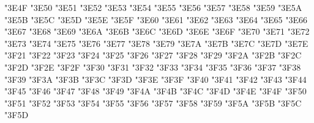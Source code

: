 {\Uchar\jis"3E4F %
\Uchar\jis"3E50 %
\Uchar\jis"3E51 %
\Uchar\jis"3E52 %
\Uchar\jis"3E53 %
\Uchar\jis"3E54 %
\Uchar\jis"3E55 %
\Uchar\jis"3E56 %
\Uchar\jis"3E57 %
\Uchar\jis"3E58 %
\Uchar\jis"3E59 %
\Uchar\jis"3E5A %
\Uchar\jis"3E5B %
\Uchar\jis"3E5C %
\Uchar\jis"3E5D %
\Uchar\jis"3E5E %
\Uchar\jis"3E5F %
\Uchar\jis"3E60 %
\Uchar\jis"3E61 %
\Uchar\jis"3E62 %
\Uchar\jis"3E63 %
\Uchar\jis"3E64 %
\Uchar\jis"3E65 %
\Uchar\jis"3E66 %
\Uchar\jis"3E67 %
\Uchar\jis"3E68 %
\Uchar\jis"3E69 %
\Uchar\jis"3E6A %
\Uchar\jis"3E6B %
\Uchar\jis"3E6C %
\Uchar\jis"3E6D %
\Uchar\jis"3E6E %
\Uchar\jis"3E6F %
\Uchar\jis"3E70 %
\Uchar\jis"3E71 %
\Uchar\jis"3E72 %
\Uchar\jis"3E73 %
\Uchar\jis"3E74 %
\Uchar\jis"3E75 %
\Uchar\jis"3E76 %
\Uchar\jis"3E77 %
\Uchar\jis"3E78 %
\Uchar\jis"3E79 %
\Uchar\jis"3E7A %
\Uchar\jis"3E7B %
\Uchar\jis"3E7C %
\Uchar\jis"3E7D %
\Uchar\jis"3E7E %
\Uchar\jis"3F21 %
\Uchar\jis"3F22 %
\Uchar\jis"3F23 %
\Uchar\jis"3F24 %
\Uchar\jis"3F25 %
\Uchar\jis"3F26 %
\Uchar\jis"3F27 %
\Uchar\jis"3F28 %
\Uchar\jis"3F29 %
\Uchar\jis"3F2A %
\Uchar\jis"3F2B %
\Uchar\jis"3F2C %
\Uchar\jis"3F2D %
\Uchar\jis"3F2E %
\Uchar\jis"3F2F %
\Uchar\jis"3F30 %
\Uchar\jis"3F31 %
\Uchar\jis"3F32 %
\Uchar\jis"3F33 %
\Uchar\jis"3F34 %
\Uchar\jis"3F35 %
\Uchar\jis"3F36 %
\Uchar\jis"3F37 %
\Uchar\jis"3F38 %
\Uchar\jis"3F39 %
\Uchar\jis"3F3A %
\Uchar\jis"3F3B %
\Uchar\jis"3F3C %
\Uchar\jis"3F3D %
\Uchar\jis"3F3E %
\Uchar\jis"3F3F %
\Uchar\jis"3F40 %
\Uchar\jis"3F41 %
\Uchar\jis"3F42 %
\Uchar\jis"3F43 %
\Uchar\jis"3F44 %
\Uchar\jis"3F45 %
\Uchar\jis"3F46 %
\Uchar\jis"3F47 %
\Uchar\jis"3F48 %
\Uchar\jis"3F49 %
\Uchar\jis"3F4A %
\Uchar\jis"3F4B %
\Uchar\jis"3F4C %
\Uchar\jis"3F4D %
\Uchar\jis"3F4E %
\Uchar\jis"3F4F %
\Uchar\jis"3F50 %
\Uchar\jis"3F51 %
\Uchar\jis"3F52 %
\Uchar\jis"3F53 %
\Uchar\jis"3F54 %
\Uchar\jis"3F55 %
\Uchar\jis"3F56 %
\Uchar\jis"3F57 %
\Uchar\jis"3F58 %
\Uchar\jis"3F59 %
\Uchar\jis"3F5A %
\Uchar\jis"3F5B %
\Uchar\jis"3F5C %
\Uchar\jis"3F5D %
}
